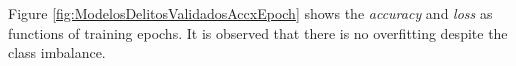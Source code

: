 \documentclass[onecolumn, journal, english, 12pt, a4paper]{IEEEtran} %
\theoremstyle{definition}
\begin{document}
Figure \ref{fig:ModelosDelitosValidadosAccxEpoch} shows the
\emph{accuracy} and \emph{loss} as functions of training epochs. It is
observed that there is no overfitting despite the class imbalance.
\end{document}
